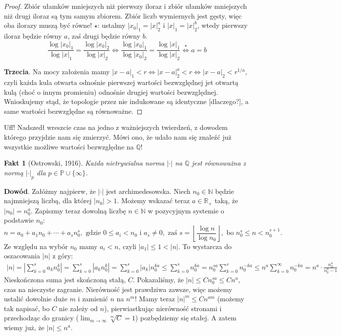 \documentclass[a4paper,fleqn,9pt]{extarticle}
\newtheorem{fkt}{Fakt}
\begin{document}
\begin{proof}
Zbiór ułamków mniejszych niż pierwszy iloraz i zbiór ułamków mniejszych niż drugi iloraz są tym samym zbiorem.
Zbiór liczb wymiernych jest gęsty, więc oba ilorazy muszą być równe!
$\star$: ustalmy $|x_0|_1 = |x|_2^a$ i $|x|_1 = |x|_2^b$, wtedy pierwszy iloraz będzie równy $a$, zaś drugi będzie równy $b$.
\begin{equation*}
\frac{\log |x_0|_1}{\log |x|_1} =
\frac{\log |x_0|_2}{\log |x|_2} \iff
\frac{\log |x_0|_1}{\log |x_0|_2} =
\frac{\log |x|_1}{\log |x|_2} \overset{\star}{\iff}
a = b
\end{equation*}

\textbf{Trzecia}. Na mocy założenia mamy $|x-a|_1 < r \Leftrightarrow |x-a|_2^a < r \Leftrightarrow |x-a|_2 < r^{1/a}$,
czyli każda kula otwarta odnośnie pierwszej wartości bezwzględnej jet otwartą kulą (choć o innym promieniu) odnośnie drugiej wartości bezwzględnej.
Wnioskujemy stąd, że topologie przez nie indukowane są identyczne [dlaczego?], a same wartości bezwzględne są równoważne.
\end{proof}

Uff! Nadszedł wreszcie czas na jedno z ważniejszych twierdzeń, z dowodem którego przyjdzie nam się zmierzyć.
Mówi ono, że udało nam się znaleźć już wszystkie możliwe wartości bezwzględne na $\mathbb Q$!

\begin{fkt}[Ostrowski, 1916]
Każda nietrywialna norma $|\cdot|$ na $\mathbb Q$ jest równoważna z normą $|\cdot|_p$ dla $p \in \mathbb P \cup \{\infty\}$.
\end{fkt}

\textbf{Dowód}. Załóżmy najpierw, że $|\cdot|$ jest archimedesowska.
Niech $n_0 \in\mathbb N$ będzie najmniejszą liczbą, dla której $|n_0| > 1$.
Możemy wskazać teraz $a\in\mathbb R_+$ taką, że $|n_0| = n_0^a$.
Zapiszmy teraz dowolną liczbę $n\in\mathbb N$ w pozycyjnym systemie o podstawie $n_0$:
\begin{equation*}
n = a_0 + a_1 n_0 + \cdots + a_s n_0^s,
\text{ gdzie }0 \le a_i < n_0
\text{ i } a_s \neq 0,
\text{ zaś } s = \left\lfloor\frac{\log n}{\log n_0}\right\rfloor,
\text{ bo }n_0^s \le n < n_0^{s+1}.
\end{equation*}
Ze względu na wybór $n_0$ mamy $a_i < n$, czyli $|a_1| \le 1 < |n| $.
To wystarcza do oszacowania $|n|$ z góry:
\begin{align*}
     |n|
   = \left|\sum_{k=0}^s a_k n_0^{k}\right|
   = \sum_{k=0}^s \left|a_k n_0^{k}\right|
   = \sum_{k=0}^s \left|a_k\right| n_0^{ka} 
 \le \sum_{k=0}^s n_0^{ka}
   = n_0^{sa} \sum_{k=0}^s n_0^{-ka}
 \le n^a \sum_{k=0}^\infty n_0^{-ka}
   = n^a \cdot \frac{n_0^a}{n_0^a - 1}
 \end{align*}
Nieskończona suma jest skończoną stałą, $C$.
Pokazaliśmy, że $|n| \le Cn_0^{sa} \le Cn^a$, czas na nieczyste zagranie.
Nierówność jest prawdziwa zawsze, więc możemy ustalić dowolnie duże $m$ i zamienić $n$ na $n^m$!
Mamy teraz $|n|^m \le Cn^{am}$ (możemy tak napisać, bo $C$ nie zależy od $n$), pierwiastkując nierówność stronami i przechodząc do granicy ($\lim_{m\to\infty} \sqrt[m]{C} = 1$) pozbędziemy się stałej.
A zatem wiemy już, że $| n| \le n^a$.
\end{document}
